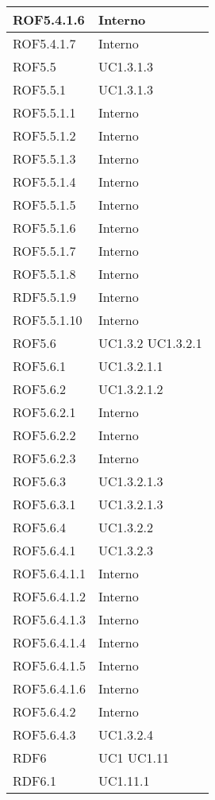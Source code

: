 \begin{center}
\begin{longtable}{| p{4cm} | p{4cm} |}
\hline
ROF5.4.1.6   &  Interno \\
\hline
ROF5.4.1.7   &  Interno \\
\hline
ROF5.5   &  UC1.3.1.3  \\
\hline
ROF5.5.1   &  UC1.3.1.3  \\
\hline
ROF5.5.1.1   &  Interno \\
\hline
ROF5.5.1.2   &  Interno \\
\hline
ROF5.5.1.3   &  Interno \\
\hline
ROF5.5.1.4   &  Interno \\
\hline
ROF5.5.1.5   &  Interno \\
\hline
ROF5.5.1.6   &  Interno \\
\hline
ROF5.5.1.7   &  Interno \\
\hline
ROF5.5.1.8   &  Interno \\
\hline
RDF5.5.1.9   &  Interno \\
\hline
ROF5.5.1.10   &  Interno \\
\hline
ROF5.6   &  UC1.3.2 \newline UC1.3.2.1 \\
\hline
ROF5.6.1   &  UC1.3.2.1.1 \\
\hline
ROF5.6.2   &  UC1.3.2.1.2 \\
\hline
ROF5.6.2.1   &  Interno \\
\hline
ROF5.6.2.2   &  Interno \\
\hline
ROF5.6.2.3   &  Interno \\
\hline
ROF5.6.3   &  UC1.3.2.1.3 \\
\hline
ROF5.6.3.1   &  UC1.3.2.1.3 \\
\hline
ROF5.6.4   &  UC1.3.2.2 \\
\hline
ROF5.6.4.1   &  UC1.3.2.3 \\
\hline
ROF5.6.4.1.1   &  Interno \\
\hline
ROF5.6.4.1.2   &  Interno \\
\hline
ROF5.6.4.1.3   &  Interno \\
\hline
ROF5.6.4.1.4   &  Interno \\
\hline
ROF5.6.4.1.5   &  Interno \\
\hline
ROF5.6.4.1.6   &  Interno \\
\hline
ROF5.6.4.2   &  Interno \\
\hline
ROF5.6.4.3   &  UC1.3.2.4 \\
\hline
RDF6   &  UC1 \newline UC1.11 \\
\hline
RDF6.1   &  UC1.11.1 \\

\end{longtable}
\end{center}
